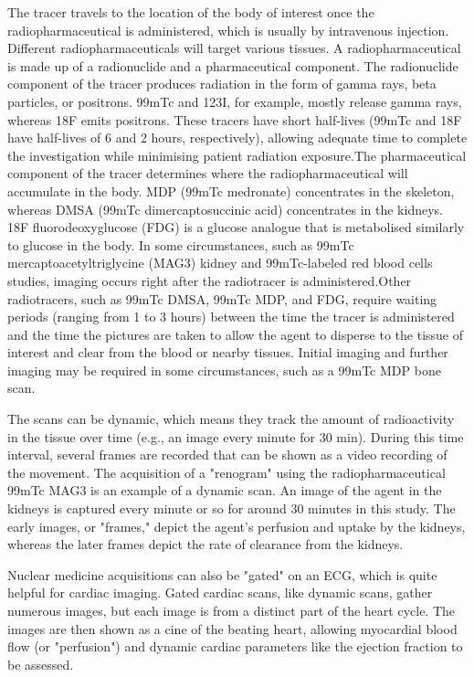 \documentclass[12pt]{article}
\begin{document}
\par
The tracer travels to the location of the body of interest once the radiopharmaceutical is administered, which is usually by intravenous injection. Different radiopharmaceuticals will target various tissues.
A radiopharmaceutical is made up of a radionuclide and a pharmaceutical component. The radionuclide component of the tracer produces radiation in the form of gamma rays, beta particles, or positrons. 99mTc and 123I, for example, mostly release gamma rays, whereas 18F emits positrons. These tracers have short half-lives (99mTc and 18F have half-lives of 6 and 2 hours, respectively), allowing adequate time to complete the investigation while minimising patient radiation exposure.The pharmaceutical component of the tracer determines where the radiopharmaceutical will accumulate in the body. MDP (99mTc medronate) concentrates in the skeleton, whereas DMSA (99mTc dimercaptosuccinic acid) concentrates in the kidneys. 18F fluorodeoxyglucose (FDG) is a glucose analogue that is metabolised similarly to glucose in the body. In some circumstances, such as 99mTc mercaptoacetyltriglycine (MAG3) kidney and 99mTc-labeled red blood cells studies, imaging occurs right after the radiotracer is administered.Other radiotracers, such as 99mTc DMSA, 99mTc MDP, and FDG, require waiting periods (ranging from 1 to 3 hours) between the time the tracer is administered and the time the pictures are taken to allow the agent to disperse to the tissue of interest and clear from the blood or nearby tissues. Initial imaging and further imaging may be required in some circumstances, such as a 99mTc MDP bone scan.
\par
The scans can be dynamic, which means they track the amount of radioactivity in the tissue over time (e.g., an image every minute for 30 min). During this time interval, several frames are recorded that can be shown as a video recording of the movement. The acquisition of a "renogram" using the radiopharmaceutical 99mTc MAG3 is an example of a dynamic scan. An image of the agent in the kidneys is captured every minute or so for around 30 minutes in this study. The early images, or "frames," depict the agent's perfusion and uptake by the kidneys, whereas the later frames depict the rate of clearance from the kidneys.
\par
Nuclear medicine acquisitions can also be "gated" on an ECG, which is quite helpful for cardiac imaging. Gated cardiac scans, like dynamic scans, gather numerous images, but each image is from a distinct part of the heart cycle. The images are then shown as a cine of the beating heart, allowing myocardial blood flow (or "perfusion") and dynamic cardiac parameters like the ejection fraction to be assessed.
\end{document}
